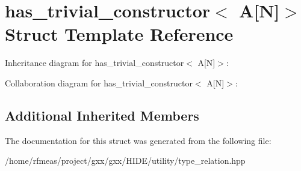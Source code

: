 \hypertarget{structhas__trivial__constructor_3_01A[N]_4}{}\section{has\+\_\+trivial\+\_\+constructor$<$ A\mbox{[}N\mbox{]}$>$ Struct Template Reference}
\label{structhas__trivial__constructor_3_01A[N]_4}


Inheritance diagram for has\+\_\+trivial\+\_\+constructor$<$ A\mbox{[}N\mbox{]}$>$\+:


Collaboration diagram for has\+\_\+trivial\+\_\+constructor$<$ A\mbox{[}N\mbox{]}$>$\+:
\subsection*{Additional Inherited Members}


The documentation for this struct was generated from the following file\+:\begin{DoxyCompactItemize}
\item 
/home/rfmeas/project/gxx/gxx/\+H\+I\+D\+E/utility/type\+\_\+relation.\+hpp\end{DoxyCompactItemize}
